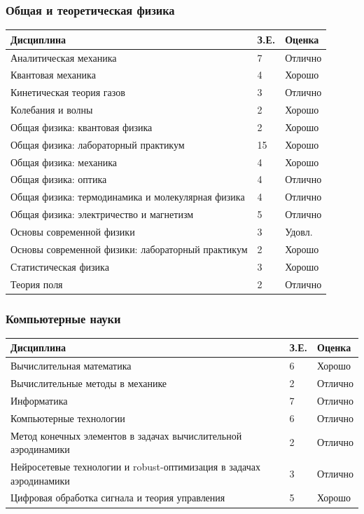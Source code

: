 \documentclass[a4paper,12pt]{article}
\begin{document}
	\subsubsection*{Общая и теоретическая физика}
	{\fontsize{9}{11}\selectfont
	\begin{tabular}{p{} p{} p{}}
	\toprule
	\textbf{Дисциплина} & \textbf{З.Е.} & \textbf{Оценка} \\
	\midrule
	Аналитическая механика & 7 & Отлично \\
	Квантовая механика & 4 & Хорошо \\
	Кинетическая теория газов & 3 & Отлично \\
	Колебания и волны & 2 & Хорошо \\
	Общая физика: квантовая физика & 2 & Хорошо \\
	Общая физика: лабораторный практикум & 15 & Хорошо \\
	Общая физика: механика & 4 & Хорошо \\
	Общая физика: оптика & 4 & Отлично \\
	Общая физика: термодинамика и молекулярная физика & 4 & Отлично \\
	Общая физика: электричество и магнетизм & 5 & Отлично \\
	Основы современной физики & 3 & Удовл. \\
	Основы современной физики: лабораторный практикум & 2 & Хорошо \\
	Статистическая физика & 3 & Хорошо \\
	Теория поля & 2 & Отлично \\
	\bottomrule
	\end{tabular}}
	
	\subsubsection*{Компьютерные науки}
	{\fontsize{9}{11}\selectfont
	\begin{tabular}{p{} p{} p{}}
	\toprule
	\textbf{Дисциплина} & \textbf{З.Е.} & \textbf{Оценка} \\
	\midrule
	Вычислительная математика & 6 & Хорошо \\
	Вычислительные методы в механике & 2 & Отлично \\
	Информатика & 7 & Отлично \\
	Компьютерные технологии & 6 & Отлично \\
	Метод конечных элементов в задачах вычислительной аэродинамики & 2 & Отлично \\
	Нейросетевые технологии и robust-оптимизация в задачах аэродинамики & 3 & Отлично \\
	Цифровая обработка сигнала и теория управления & 5 & Хорошо \\
	\bottomrule
	\end{tabular}}
\end{document}

